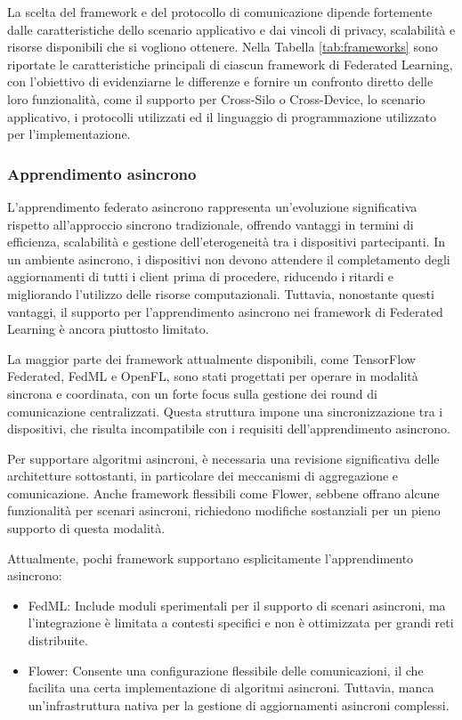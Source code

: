 \documentclass[a4paper, oneside, openright]{report}
\begin{document}
La scelta del framework e del protocollo di comunicazione dipende fortemente dalle caratteristiche dello scenario applicativo e dai vincoli di privacy, scalabilità e risorse disponibili che si vogliono ottenere. 
Nella Tabella \ref{tab:frameworks} sono riportate le caratteristiche principali di ciascun framework di Federated Learning, con l'obiettivo di evidenziarne le differenze e fornire un confronto diretto delle loro funzionalità, come il supporto per Cross-Silo o Cross-Device, lo scenario applicativo, i protocolli utilizzati ed il linguaggio di programmazione utilizzato per l'implementazione.







\subsubsection*{Apprendimento asincrono}



L'apprendimento federato asincrono rappresenta un'evoluzione significativa rispetto all'approccio sincrono tradizionale, offrendo vantaggi in termini di efficienza, scalabilità e gestione dell'eterogeneità tra i dispositivi partecipanti. In un ambiente asincrono, i dispositivi non devono attendere il completamento degli aggiornamenti di tutti i client prima di procedere, riducendo i ritardi e migliorando l'utilizzo delle risorse computazionali. Tuttavia, nonostante questi vantaggi, il supporto per l'apprendimento asincrono nei framework di Federated Learning è ancora piuttosto limitato.

La maggior parte dei framework attualmente disponibili, come TensorFlow Federated, FedML e OpenFL, sono stati progettati per operare in modalità sincrona e coordinata, con un forte focus sulla gestione dei round di comunicazione centralizzati. Questa struttura impone una sincronizzazione  tra i dispositivi, che risulta incompatibile con i requisiti dell'apprendimento asincrono.

Per supportare algoritmi asincroni, è necessaria una revisione significativa delle architetture sottostanti, in particolare dei meccanismi di aggregazione e comunicazione. Anche framework flessibili come Flower, sebbene offrano alcune funzionalità per scenari asincroni, richiedono modifiche sostanziali per un pieno supporto di questa modalità.

Attualmente, pochi framework supportano esplicitamente l'apprendimento asincrono:
\begin{itemize}
\item FedML: Include moduli sperimentali per il supporto di scenari asincroni, ma l'integrazione è limitata a contesti specifici e non è ottimizzata per grandi reti distribuite.
\item Flower: Consente una configurazione flessibile delle comunicazioni, il che facilita una certa implementazione di algoritmi asincroni. Tuttavia, manca un'infrastruttura nativa per la gestione di aggiornamenti asincroni complessi.
\end{itemize}
\end{document}
